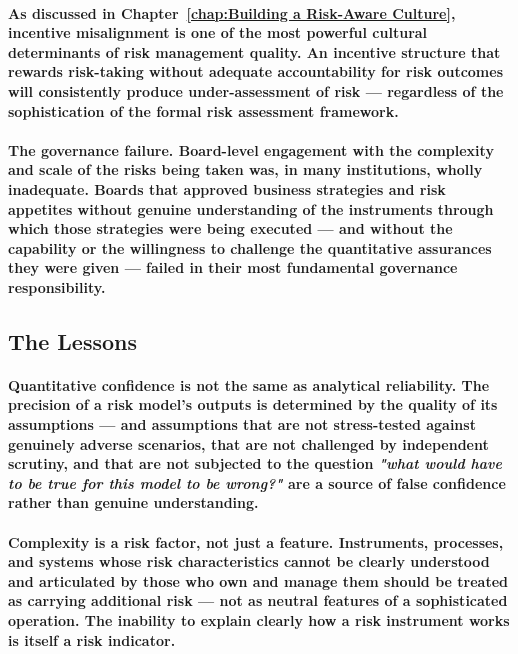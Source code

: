\paragraph{As discussed in Chapter~\ref{chap:Building a Risk-Aware Culture}, incentive misalignment is one of the most powerful cultural determinants of risk management quality. An incentive structure that rewards risk-taking without adequate accountability for risk outcomes will consistently produce under-assessment of risk — regardless of the sophistication of the formal risk assessment framework.}
\paragraph{\textbf{The governance failure}. Board-level engagement with the complexity and scale of the risks being taken was, in many institutions, wholly inadequate. Boards that approved business strategies and risk appetites without genuine understanding of the instruments through which those strategies were being executed — and without the capability or the willingness to challenge the quantitative assurances they were given — failed in their most fundamental governance responsibility.}

\subsection{The Lessons}
\paragraph{\textbf{Quantitative confidence is not the same as analytical reliability}. The precision of a risk model's outputs is determined by the quality of its assumptions — and assumptions that are not stress-tested against genuinely adverse scenarios, that are not challenged by independent scrutiny, and that are not subjected to the question \textit{"what would have to be true for this model to be wrong?"} are a source of false confidence rather than genuine understanding.}
\paragraph{\textbf{Complexity is a risk factor, not just a feature}. Instruments, processes, and systems whose risk characteristics cannot be clearly understood and articulated by those who own and manage them should be treated as carrying additional risk — not as neutral features of a sophisticated operation. The inability to explain clearly how a risk instrument works is itself a risk indicator.}
